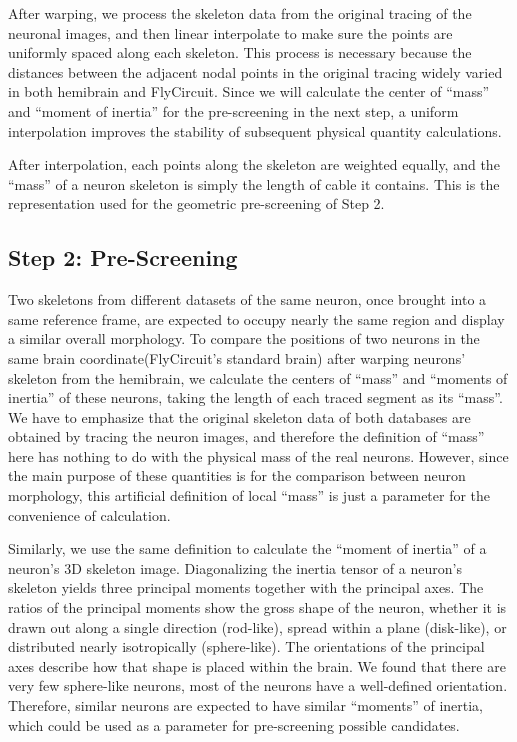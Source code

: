 \documentclass[10pt,a4paper]{article}
\begin{document}
After warping, we process the skeleton data from the original tracing of the
neuronal images, and then linear interpolate to make sure the points are uniformly spaced along each skeleton. 
This process is necessary because the distances between the adjacent
nodal points in the original tracing widely varied in both hemibrain and
FlyCircuit. Since we will calculate the center of ``mass'' and ``moment of
inertia'' for the pre-screening in the next step, a uniform interpolation improves
the stability of subsequent physical quantity calculations.

After interpolation, each points along the skeleton are weighted equally, and
the ``mass'' of a neuron skeleton is simply the length of cable it contains. This is the representation used for the geometric pre-screening of Step 2.

\subsection*{Step 2: Pre-Screening}

Two skeletons from different datasets of the same neuron, once brought into a same reference frame, are expected to occupy nearly the same region and display a similar overall morphology.
To compare the positions of two neurons in the same brain coordinate(FlyCircuit's standard brain) after warping neurons' skeleton from the hemibrain, we calculate the centers of ``mass'' and ``moments of inertia'' of these neurons, taking the length of each traced segment as its ``mass''.
We have to emphasize that the original skeleton data of both databases are
obtained by tracing the neuron images, and therefore the definition of ``mass''
here has nothing to do with the physical mass of the real neurons. However,
since the main purpose of these quantities is for the comparison between neuron
morphology, this artificial definition of local ``mass'' is just a parameter for
the convenience of calculation.

Similarly, we use the same definition to calculate the ``moment of
inertia'' of a neuron's 3D skeleton image. Diagonalizing the inertia tensor of a neuron's skeleton yields three principal moments together with the principal axes. The
ratios of the principal moments show the gross shape of the
neuron, whether it is drawn out along a single direction (rod-like),
spread within a plane (disk-like), or distributed nearly isotropically
(sphere-like).  The orientations of the principal axes describe how that
shape is placed within the brain.
We found that there are very few sphere-like neurons, most of the neurons have a well-defined orientation. Therefore, similar neurons are expected to have similar ``moments'' of inertia, which could be used as a parameter for pre-screening possible candidates.
\end{document}
